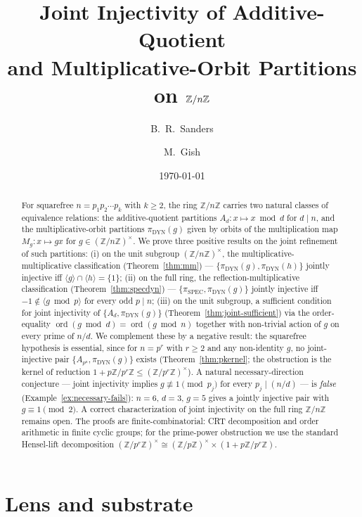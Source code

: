 \documentclass[11pt,reqno]{amsart}
\title[Joint injectivity of additive-quotient and multiplicative-orbit partitions]%
{Joint Injectivity of Additive-Quotient\\
 and Multiplicative-Orbit Partitions on $\Z/n\Z$}
\author{B.~R.~Sanders}
\author{M.~Gish}
\date{\today}
\theoremstyle{plain}
\theoremstyle{definition}
\theoremstyle{remark}
\DeclareMathOperator{\ord}{ord}
\DeclareMathOperator{\spec}{SPEC}
\DeclareMathOperator{\dyn}{DYN}
\newcommand{\Z}{\mathbb{Z}}
\begin{document}
\begin{abstract}
For squarefree $n = p_{1} p_{2} \cdots p_{k}$ with $k \ge 2$, the
ring $\Z/n\Z$ carries two natural classes of equivalence relations:
the additive-quotient partitions $A_{d} : x \mapsto x \bmod d$ for
$d \mid n$, and the multiplicative-orbit partitions
$\pi_{\dyn}(g)$ given by orbits of the multiplication map
$M_{g} : x \mapsto g x$ for $g \in (\Z/n\Z)^{\times}$. We prove
three positive results on the joint refinement of such partitions:
(i) on the unit subgroup $(\Z/n\Z)^{\times}$, the
multiplicative-multiplicative classification
(Theorem~\ref{thm:mm}) --- $\{\pi_{\dyn}(g), \pi_{\dyn}(h)\}$
jointly injective iff $\langle g \rangle \cap \langle h \rangle =
\{1\}$; (ii) on the full ring, the reflection-multiplicative
classification (Theorem~\ref{thm:specdyn}) --- $\{\pi_{\spec},
\pi_{\dyn}(g)\}$ jointly injective iff $-1 \notin \langle g \bmod
p \rangle$ for every odd $p \mid n$; (iii) on the unit subgroup, a
sufficient condition for joint injectivity of $\{A_{d},
\pi_{\dyn}(g)\}$ (Theorem~\ref{thm:joint-sufficient}) via the
order-equality $\ord(g \bmod d) = \ord(g \bmod n)$ together with
non-trivial action of $g$ on every prime of $n/d$. We complement
these by a negative result: the squarefree hypothesis is essential,
since for $n = p^{r}$ with $r \ge 2$ and any non-identity $g$, no
joint-injective pair $\{A_{p^{a}}, \pi_{\dyn}(g)\}$ exists
(Theorem~\ref{thm:pkernel}; the obstruction is the kernel of
reduction $1 + p\Z/p^{r}\Z \le (\Z/p^{r}\Z)^{\times}$). A natural
necessary-direction conjecture --- joint injectivity implies
$g \not\equiv 1 \pmod{p_{j}}$ for every $p_{j} \mid (n/d)$ --- is
\emph{false} (Example~\ref{ex:necessary-fails}): $n = 6$, $d = 3$,
$g = 5$ gives a jointly injective pair with $g \equiv 1 \pmod 2$.
A correct characterization of joint injectivity on the full ring
$\Z/n\Z$ remains open. The proofs are finite-combinatorial: CRT
decomposition and order arithmetic in finite cyclic groups; for the
prime-power obstruction we use the standard Hensel-lift decomposition
$(\Z/p^{r}\Z)^{\times} \cong (\Z/p\Z)^{\times} \times (1 +
p\Z/p^{r}\Z)$.
\end{abstract}

\maketitle

\section*{Lens and substrate}\label{sec:lens}
\end{document}
